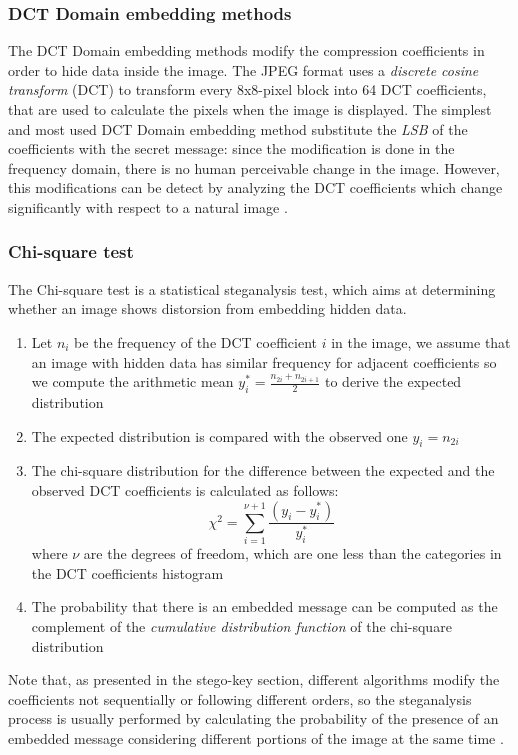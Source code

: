 \documentclass[../../main.tex]{subfiles}
\begin{document}
\subsubsection{DCT Domain embedding methods}
The DCT Domain embedding methods modify the compression coefficients
in order to hide data inside the image.
The JPEG format uses a \emph{discrete cosine transform} (DCT) to transform
every 8x8-pixel block into 64 DCT coefficients, that are used to calculate
the pixels when the image is displayed.
The simplest and most used DCT Domain embedding method substitute the
\emph{LSB} of the coefficients with the secret message: since the
modification is done in the frequency domain, there is no human perceivable
change in the image.
However, this modifications can be detect by analyzing the DCT coefficients
which change significantly with respect to a natural image
\cite{jpeg-image-internet}.
\subsubsection{Chi-square test}
The Chi-square test is a statistical steganalysis test, which aims
at determining whether an image shows distorsion from embedding hidden data.
\begin{enumerate}
    \item Let $n_i$ be the frequency of the DCT coefficient $i$ in the
        image, we assume that an image with hidden data has similar
        frequency for adjacent coefficients so we compute the arithmetic
        mean $y_{i}^{*} = \frac{n_{2i}+n_{2i+1}}{2}$ to derive the expected
        distribution
    \item The expected distribution is compared with the observed one
        $y_i = n_{2i}$
    \item The chi-square distribution for the difference between the
        expected and the observed DCT coefficients is calculated as follows:
        $$ \chi^2 = \sum_{i=1}^{\nu+1}
        \frac{\left( y_i-y_{i}^{*}\right)}{y_{i}^{*}}$$
        where $\nu$ are the degrees of freedom, which are one less than the
        categories in the DCT coefficients histogram
    \item The probability that there is an embedded message can be computed
        as the complement of the \emph{cumulative distribution function} of
        the chi-square distribution
\end{enumerate}
Note that, as presented in the stego-key section, different algorithms
modify the coefficients not sequentially or following different orders, so
the steganalysis process is usually performed by calculating the probability
of the presence of an embedded message considering different portions of the
image at the same time \cite{jpeg-image-internet}.
\end{document}
